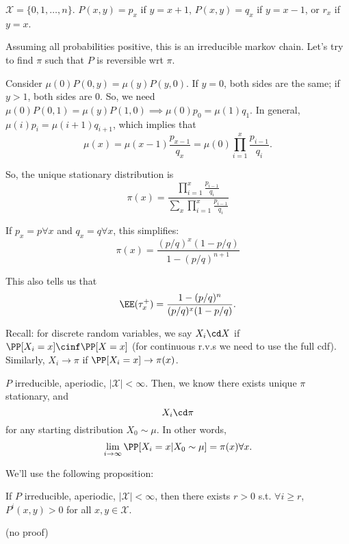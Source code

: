 \begin{example}

$\mathcal{X} = \{0,1,\hdots, n\}$. $P(x,y) = p_x$ if $y=x+1$, $P(x,y) = q_x$ if $y=x-1$, or $r_x$ if $y=x$. 
\end{example}

Assuming all probabilities positive, this is an irreducible markov chain. Let's try to find $\pi$ such that $P$ is reversible wrt $\pi$. 

Consider $\mu(0)P(0,y) = \mu(y)P(y,0)$. If $y=0$, both sides are the same; if $y>1$, both sides are $0$. So, we need $\mu(0)P(0,1)=\mu(y)P(1,0) \implies \mu(0)p_0=\mu(1)q_1$. In general, $\mu(i)p_i = \mu(i+1)q_{i+1}$, which implies that 
\[\mu(x) = \mu(x-1)\frac{p_{x-1}}{q_x} = \mu(0) \prod_{i=1}^x \frac{p_{i-1}}{q_i}.\]

So, the unique stationary distribution is
\[\pi(x) = \frac{\prod_{i=1}^x \frac{p_{i-1}}{q_i}}{\sum_x \prod_{i=1}^x \frac{p_{i-1}}{q_i}}\]

If $p_x=p\forall x$ and $q_x=q\forall x$, this simplifies: 
\[\pi(x) = \frac{(p/q)^x(1-p/q)}{1-(p/q)^{n+1}}\]

This also tells us that 
\[\EE(\tau_x^+) = \frac{1-(p/q)^n}{(p/q)^x(1-p/q)}. \]

Recall: for discrete random variables, we say $X_i\cd X$ if $\PP[X_i=x]\cinf \PP[X=x]$ (for continuous r.v.s we need to use the full cdf). Similarly, $X_i\rightarrow \pi$ if $\PP[X_i=x]\rightarrow \pi(x)$. 

\begin{theorem}

$P$ irreducible, aperiodic, $\vert \mathcal{X}\vert < \infty$. Then, we know there exists unique $\pi$ stationary, and 
\[X_i\cd \pi\]
for any starting distribution $X_0\sim \mu$. In other words, 
\[\lim_{i\rightarrow \infty}\PP[X_i=x|X_0\sim \mu] = \pi(x)\forall x.\]
\end{theorem}

We'll use the following proposition: 

\begin{theorem}
\proplabel

If $P$ irreducible, aperiodic, $\vert \mathcal{X}\vert < \infty$, then there exists $r>0$ s.t. $\forall i\geq r$, $P^i(x,y)>0$ for all $x,y\in \mathcal{X}$. 
\end{theorem}

(no proof)

